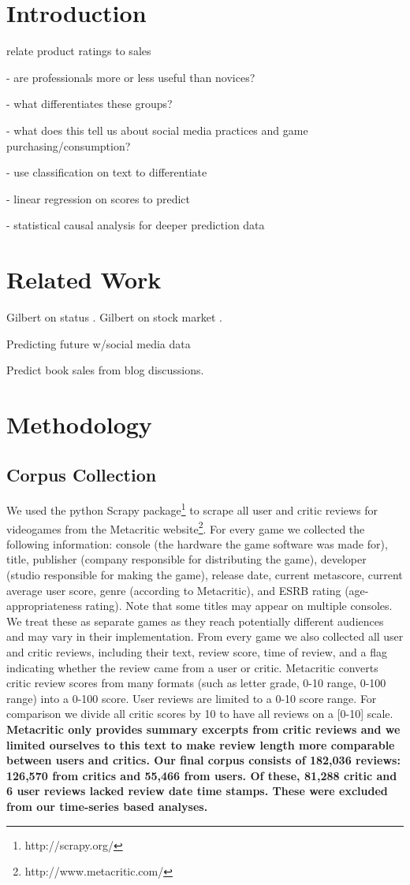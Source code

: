 \documentclass[letterpaper]{article}
\begin{document}
\section{Introduction}
relate product ratings to sales

- are professionals more or less useful than novices?

- what differentiates these groups?

- what does this tell us about social media practices and game purchasing/consumption?


- use classification on text to differentiate

- linear regression on scores to predict

- statistical causal analysis for deeper prediction data

\section{Related Work}
Gilbert on status \cite{gilbert2012phrases}. Gilbert on stock market \cite{gilbert2010widespread}.

Predicting future w/social media data \cite{asur2010predicting}

Predict book sales from blog discussions.

\section{Methodology}

\subsection{Corpus Collection}
We used the python Scrapy package\footnote{http://scrapy.org/} to scrape all user and critic reviews for videogames from the Metacritic website\footnote{http://www.metacritic.com/}. For every game we collected the following information: console (the hardware the game software was made for), title, publisher (company responsible for distributing the game), developer (studio responsible for making the game), release date, current metascore, current average user score, genre (according to Metacritic), and ESRB rating (age-appropriateness rating). Note that some titles may appear on multiple consoles. We treat these as separate games as they reach potentially different audiences and may vary in their implementation. From every game we also collected all user and critic reviews, including their text, review score, time of review, and a flag indicating whether the review came from a user or critic. Metacritic converts critic review scores from many formats (such as letter grade, 0-10 range, 0-100 range) into a 0-100 score. User reviews are limited to a 0-10 score range. For comparison we divide all critic scores by 10 to have all reviews on a [0-10] scale. \textbf{Metacritic only provides summary excerpts from critic reviews and we limited ourselves to this text to make review length more comparable between users and critics. Our final corpus consists of 182,036 reviews: 126,570 from critics and 55,466 from users. Of these, 81,288 critic and 6 user reviews lacked review date time stamps. These were excluded from our time-series based analyses.}
\end{document}
